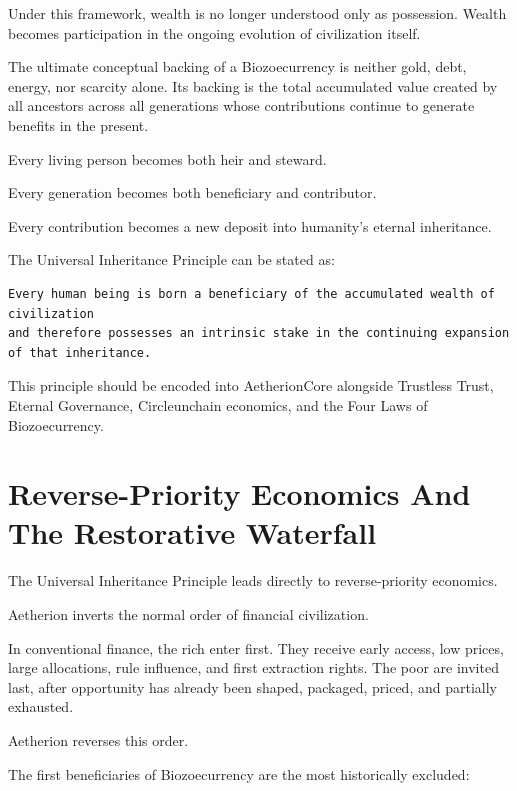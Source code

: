 ﻿\documentclass[12pt]{article}
\begin{document}
Under this framework, wealth is no longer understood only as possession. Wealth becomes participation in the ongoing evolution of civilization itself.

The ultimate conceptual backing of a Biozoecurrency is neither gold, debt, energy, nor scarcity alone. Its backing is the total accumulated value created by all ancestors across all generations whose contributions continue to generate benefits in the present.

Every living person becomes both heir and steward.

Every generation becomes both beneficiary and contributor.

Every contribution becomes a new deposit into humanity's eternal inheritance.

The Universal Inheritance Principle can be stated as:

\begin{verbatim}
Every human being is born a beneficiary of the accumulated wealth of civilization
and therefore possesses an intrinsic stake in the continuing expansion of that inheritance.
\end{verbatim}

This principle should be encoded into AetherionCore alongside Trustless Trust, Eternal Governance, Circleunchain economics, and the Four Laws of Biozoecurrency.

\section{Reverse-Priority Economics And The Restorative Waterfall}


The Universal Inheritance Principle leads directly to reverse-priority economics.

Aetherion inverts the normal order of financial civilization.

In conventional finance, the rich enter first. They receive early access, low prices, large allocations, rule influence, and first extraction rights. The poor are invited last, after opportunity has already been shaped, packaged, priced, and partially exhausted.

Aetherion reverses this order.

The first beneficiaries of Biozoecurrency are the most historically excluded:
\end{document}
